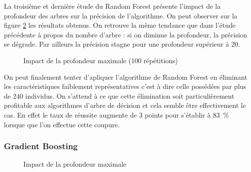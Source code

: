 \documentclass[11pt,a4paper]{article}
\begin{document}
			La troisième et dernière étude du Random Forest présente l'impact de la profondeur des arbres sur la précision de l'algorithme. On peut observer sur la figure \ref{rf_depth} les résultats obtenus. On retrouve la même tendance que dans l'étude précédente à propos du nombre d'arbre : si on diminue la profondeur, la précision se dégrade. Par ailleurs la précision stagne pour une profondeur supérieur à 20.

			\begin{figure}
				\begin{center}
					\caption{Impact de la profondeur maximale (100 répétitions)}
					\label{rf_depth}
				\end{center}
			\end{figure}

			On peut finalement tenter d'apliquer l'algorithme de Random Forest en éliminant les caractéristiques faiblement représentatives c'est à dire celle possédées par plus de 240 individus. On s'attend à ce que cette élimination soit particulièrement profitable aux algorithmes d'arbre de décision et cela semble être effectivement le cas. En effet le taux de réussite augmente de 3 points pour s'établir à \SI{83}{\percent} lorsque que l'on effectue cette coupure.

		\subsubsection{Gradient Boosting}

			\begin{figure}
				\begin{center}
					\caption{Impact de la profondeur maximale}
					\label{rf_depth}
				\end{center}
			\end{figure}
\end{document}
